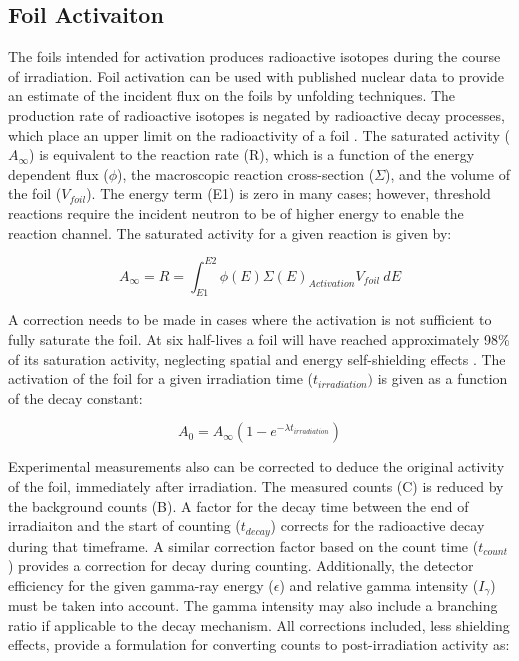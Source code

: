 \documentclass[journal]{IEEEtran}
\begin{document}
	\subsection{Foil Activaiton}
	The foils intended for activation produces radioactive isotopes during the 
	course of irradiation.  
Foil activation can be used with published 	nuclear data to provide an estimate of the incident flux on the foils by unfolding techniques. 
The production rate of radioactive isotopes is negated by radioactive decay processes, which place an upper limit on the radioactivity of a foil \cite{Knoll}. 
The saturated activity ($A_{\infty}$) is equivalent to the reaction rate (R), which is a function of the energy dependent flux ($\phi$), the macroscopic reaction cross-section ($\Sigma$), and the volume of the foil ($V_{foil}$). 
The energy term (E1) is zero in many cases; however, threshold reactions require the incident neutron to be of higher energy to enable the reaction channel. 
The saturated activity for a given reaction is given by: 

	\begin{equation} \label{eq:InfReactionRate}
	A_{\infty} = R = \int_{E1}^{E2} \phi(E) \Sigma(E) _{Activation} V_{foil} 
	\:dE 
	\end{equation}
	
	A correction needs to be made in cases where the activation is not sufficient 
	to fully saturate the foil. At six half-lives a foil will have reached 
	approximately 98\% of its saturation activity, neglecting spatial and energy 
	self-shielding effects \cite{Knoll}. The activation of the foil for a given 
	irradiation time ($t_{irradiation})$ is given as a function of the decay 
	constant: 
	
	\begin{equation} \label{eq:ReactionRate}
	A_{0} = A_{\infty}(1-e^{-\lambda t_{irradiation}}) 
	\end{equation}
	
	Experimental measurements also can be corrected to deduce the original activity 
	of the foil, immediately after irradiation. The measured counts (C) is reduced 
	by the background counts (B). A factor for the decay time between the end of 
	irradiaiton and the start of counting ($t_{decay}$) corrects for the 
	radioactive decay during that timeframe. A similar correction factor based on 
	the count time ($t_{count}$) provides a correction for decay during counting. 
	Additionally, the detector efficiency for the given gamma-ray energy 
	($\epsilon$) 
	and relative gamma intensity ($I_{\gamma}$) must be taken into account. The 
	gamma intensity may also include a branching ratio if applicable to the decay 
	mechanism. All corrections included, less shielding effects, provide a 
	formulation for converting counts to post-irradiation activity as: 
	
\end{document}

